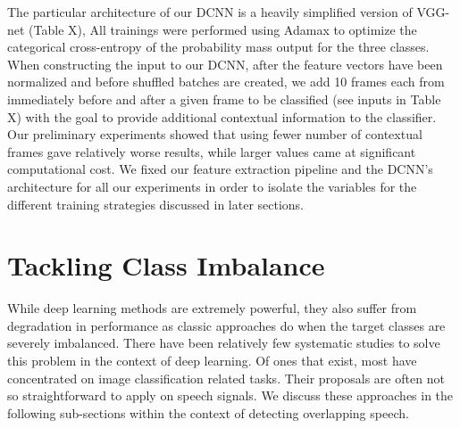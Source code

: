 \documentclass[a4paper]{article}
\begin{document}
The particular architecture of our DCNN is a heavily simplified version of VGG-net (Table X),  %
All trainings were performed using Adamax to optimize the categorical cross-entropy of the probability mass output for the three classes.
When constructing the input to our DCNN,
after the feature vectors have been normalized and before shuffled batches are created,
we add 10 frames each from immediately before and after a given frame to be classified (see inputs in Table X)  %
with the goal to provide additional contextual information to the classifier.
Our preliminary experiments showed that using fewer number of contextual frames gave relatively worse results,
while larger values came at significant computational cost.
We fixed our feature extraction pipeline and the DCNN's architecture for all our experiments in order to isolate the variables for the different training strategies discussed in later sections.

\section{Tackling Class Imbalance}
While deep learning methods are extremely powerful,
they also suffer from degradation in performance as classic approaches do when the target classes are severely imbalanced.
There have been relatively few systematic studies to solve this problem in the context of deep learning.
Of ones that exist, most have concentrated on image classification related tasks.  %
Their proposals are often not so straightforward to apply on speech signals.
We discuss these approaches in the following sub-sections within the context of detecting overlapping speech.

\end{document}
